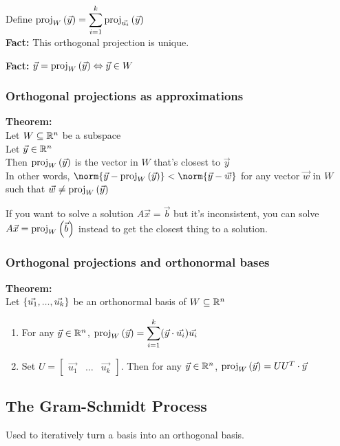Define $\displaystyle \mathrm{proj}_{W}\left(\Vec y\right) = \sum_{i=1}^k \mathrm{proj}_{\Vec{u_i}}\left(\Vec y\right)$\\
\textbf{Fact:} This orthogonal projection is unique.

\textbf{Fact:} $\Vec y = \mathrm{proj}_{W}\left(\Vec y\right) \Leftrightarrow \Vec y \in W$

\subsubsection*{Orthogonal projections as approximations}

\textbf{Theorem:}\\
Let $W \subseteq \mathbb{R}^n$ be a subspace\\
Let $\Vec y \in \mathbb{R}^n$\\
Then $\mathrm{proj}_{W}\left(\Vec y\right)$ is the vector in $W$ that's closest to $\Vec y$\\
In other words, $\norm{\Vec y - \Proj{W}{\Vec y}} < \norm{\Vec y - \Vec w}$ for any vector $\Vec w$ in $W$ such that $\Vec w \neq \mathrm{proj}_{W}\left(\Vec y\right)$

If you want to solve a solution $A\Vec x = \Vec b$ but it's inconsistent, you can solve $A\Vec x = \mathrm{proj}_{W}\left(\Vec b\right)$ instead to get the closest thing to a solution.

\subsubsection*{Orthogonal projections and orthonormal bases}

\textbf{Theorem:}\\
Let $\left\{\Vec{u_1}, ..., \Vec{u_k}\right\}$ be an orthonormal basis of $W \subseteq \mathbb{R}^n$
\begin{enumerate}
    \item For any $\Vec y \in \mathbb{R}^n$, $\displaystyle \mathrm{proj}_{W}\left(\Vec y\right) = \sum_{i=1}^k (\Vec y \cdot \Vec{u_i}) \Vec{u_i}$
    \item Set $U = \begin{bmatrix}\Vec{u_1} & \hdots & \Vec{u_k}\end{bmatrix}$. Then for any $\Vec y \in \mathbb{R}^n$, $\mathrm{proj}_{W}\left(\Vec y\right) = UU^T\cdot \Vec y$
\end{enumerate}

\subsection{The Gram-Schmidt Process}

Used to iteratively turn a basis into an orthogonal basis.

